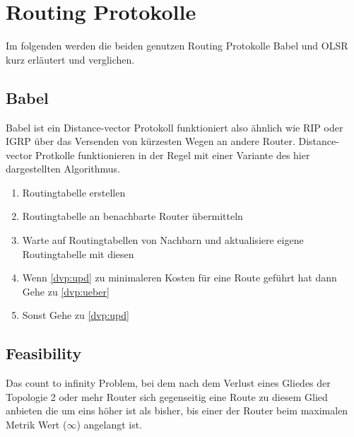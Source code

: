 \documentclass[10pt]{scrartcl}
\begin{document}
	
		
		
	
	
\section{Routing Protokolle}
	Im folgenden werden die beiden genutzen Routing Protokolle Babel und OLSR kurz erläutert und verglichen.
	
	\subsection{Babel}
	Babel ist ein Distance-vector Protokoll funktioniert also ähnlich wie RIP oder IGRP über das Versenden von kürzesten Wegen an andere Router. Distance-vector Protkolle funktionieren in der Regel mit einer Variante des hier dargestellten Algorithmus.
	
	\begin{enumerate}
		\item Routingtabelle erstellen
		\item \label{dvp:ueber} Routingtabelle an benachbarte Router übermitteln
		\item \label{dvp:upd} Warte auf Routingtabellen von Nachbarn und aktualisiere eigene Routingtabelle mit diesen
		\item Wenn \ref{dvp:upd} zu minimaleren Kosten für eine Route geführt hat dann
			\subitem Gehe zu \ref{dvp:ueber}
		\item Sonst
			\subitem Gehe zu \ref{dvp:upd}
	\end{enumerate}
	
	\subsection{Feasibility}
	Das count to infinity Problem, bei dem nach dem Verlust eines Gliedes der Topologie 2 oder mehr Router sich gegenseitig eine Route zu diesem Glied anbieten die um eins höher ist als bisher, bis einer der Router beim maximalen Metrik Wert ($\infty$) angelangt ist. 
	
\end{document}
